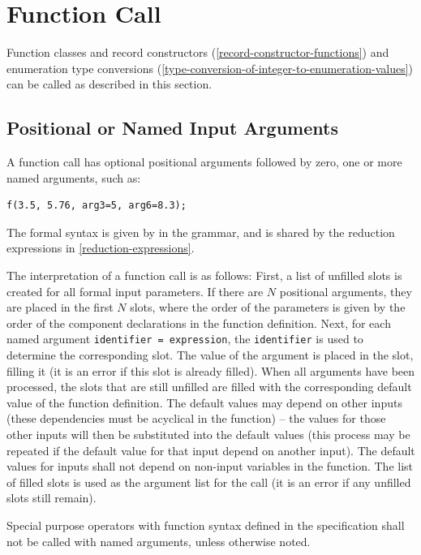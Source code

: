 \section{Function Call}\label{function-call}

Function classes and record constructors (\cref{record-constructor-functions}) and enumeration type conversions (\cref{type-conversion-of-integer-to-enumeration-values}) can be called as described in this section.

\subsection{Positional or Named Input Arguments}\label{positional-or-named-input-arguments-of-functions}

A function call has optional positional arguments followed by zero, one or more named arguments, such as:
\begin{lstlisting}[language=modelica]
f(3.5, 5.76, arg3=5, arg6=8.3);
\end{lstlisting}
The formal syntax is given by  in the grammar, and is shared by the reduction expressions in \cref{reduction-expressions}.

The interpretation of a function call is as follows: First, a list of unfilled slots is created for all formal input parameters.
If there are $N$ positional arguments, they are placed in the first $N$ slots, where the order of the parameters is given by the order of the component declarations in the function definition.
Next, for each named argument \lstinline!identifier = expression!, the \lstinline!identifier! is used to determine the corresponding slot.
The value of the argument is placed in the slot, filling it (it is an error if this slot is already filled).
When all arguments have been processed, the slots that are still unfilled are filled with the corresponding default value of the function definition.
The default values may depend on other inputs (these dependencies must be acyclical in the function) -- the values for those other inputs will then be substituted into the default values (this process may be repeated if the default value for that input depend on another input).
The default values for inputs shall not depend on non-input variables in the function.
The list of filled slots is used as the argument list for the call (it is an error if any unfilled slots still remain).

Special purpose operators with function syntax defined in the specification shall not be called with named arguments, unless otherwise noted.

